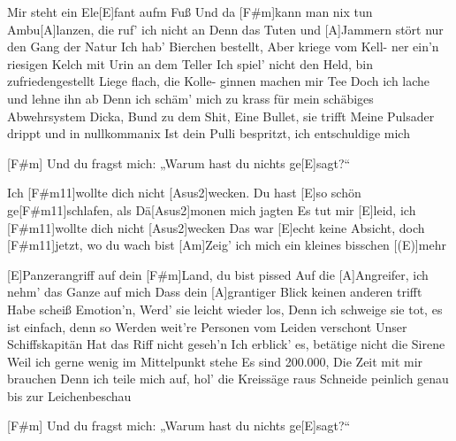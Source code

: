 



\begin{guitar}
	Mir steht ein Ele[E]fant aufm Fuß
	Und da [F#m]kann man nix tun
	Ambu[A]lanzen, die ruf' ich nicht an
	Denn das Tuten und [A]Jammern stört nur den Gang der Natur
	Ich hab' Bierchen bestellt,
	Aber kriege vom Kell-
	ner ein'n riesigen Kelch mit Urin an dem Teller
	Ich spiel' nicht den Held, bin zufriedengestellt
	Liege flach, die Kolle-
	ginnen machen mir Tee
	Doch ich lache und lehne ihn ab
	Denn ich schäm' mich zu krass für mein schäbiges Abwehrsystem
	Dicka, Bund zu dem Shit, 
	Eine Bullet, sie trifft
	Meine Pulsader drippt und in nullkommanix
	Ist dein Pulli bespritzt, ich entschuldige mich
	
	\begin{slimhighlightbar}
		[F#m] Und du fragst mich: „Warum hast du nichts ge[E]sagt?“
	\end{slimhighlightbar}
	
	\begin{highlightbar}
		\songsection{Refrain}
		Ich [F#m11]wollte dich nicht [Asus2]wecken.
		Du hast [E]so schön ge[F#m11]schlafen, als Dä[Asus2]monen mich jagten
		Es tut mir [E]leid, ich [F#m11]wollte dich nicht [Asus2]wecken
		Das war [E]echt keine Absicht, doch [F#m11]jetzt, wo du wach bist
		[Am]Zeig' ich mich ein kleines bisschen [(E)]mehr
	\end{highlightbar}
	\pagebreak
	\songsection{Strophe 2}
	[E]Panzerangriff auf dein
	[F#m]Land, du bist pissed
	Auf die [A]Angreifer, ich nehm' das Ganze auf mich
	Dass dein [A]grantiger Blick keinen anderen trifft
	Habe scheiß Emotion'n,
	Werd' sie leicht wieder los,
	Denn ich schweige sie tot, es ist einfach, denn so
	Werden weit're Personen vom Leiden verschont
	Unser Schiffskapitän
	Hat das Riff nicht geseh'n
	Ich erblick' es, betätige nicht die Sirene
	Weil ich gerne wenig im Mittelpunkt stehe
	Es sind 200.000,
	Die Zeit mit mir brauchen
	Denn ich teile mich auf, hol' die Kreissäge raus
	Schneide peinlich genau bis zur Leichenbeschau
	
	\begin{slimhighlightbar}
		\songsection{Transition}
		[F#m] Und du fragst mich: „Warum hast du nichts ge[E]sagt?“
	\end{slimhighlightbar}
	

\end{guitar}
